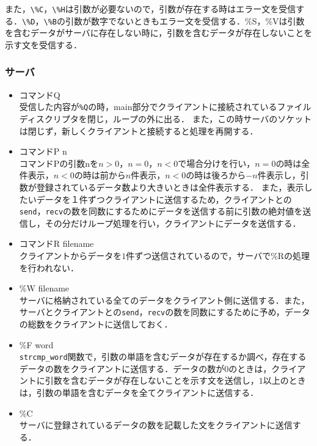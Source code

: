 \documentclass{jarticle}[11pt]
\begin{document}
\begin{itemize}
また，\verb|\%C|，\verb|\%H|は引数が必要ないので，引数が存在する時はエラー文を受信する．\verb|\%D|，\verb|\%B|の引数が数字でないときもエラー文を受信する．\%S，\%Vは引数を含むデータがサーバに存在しない時に，引数を含むデータが存在しないことを示す文を受信する．

\end{itemize}

\subsubsection{サーバ}
\begin{itemize}
\item コマンドQ \\
受信した内容が\verb|%Q|の時，main部分でクライアントに接続されているファイルディスクリプタを閉じ，ループの外に出る．
また，この時サーバのソケットは閉じず，新しくクライアントと接続すると処理を再開する．

\item コマンドP n\\
コマンドPの引数nを$n>0，n=0，n<0$で場合分けを行い，$n=0$の時は全件表示，$n<0$の時は前から$n$件表示，$n<0$の時は後ろから$-n$件表示し，引数が登録されているデータ数より大きいときは全件表示する．
  また，表示したいデータを１件ずつクライアントに送信するため，クライアントとの\verb|send|，\verb|recv|の数を同数にするためにデータを送信する前に引数の絶対値を送信し，その分だけループ処理を行い，クライアントにデータを送信する．

\item コマンドR filename\\
クライアントからデータを$1$件ずつ送信されているので，サーバで\%Rの処理を行われない．

\item \%W filename\\
サーバに格納されている全てのデータをクライアント側に送信する．また，サーバとクライアントとの\verb|send|，\verb|recv|の数を同数にするために予め，データの総数をクライアントに送信しておく．

\item \%F word\\
\verb|strcmp_word|関数で，引数の単語を含むデータが存在するか調べ，存在するデータの数をクライアントに送信する．データの数が$0$のときは，クライアントに引数を含むデータが存在しないことを示す文を送信し，$1$以上のときは，引数の単語を含むデータを全てクライアントに送信する．

\item \%C \\
サーバに登録されているデータの数を記載した文をクライアントに送信する．


\end{itemize}
\end{document}
